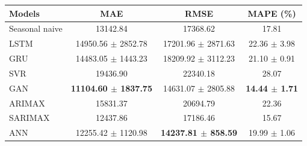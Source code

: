 \begin{tabular}{lccc}
\hline
Models & MAE & RMSE & MAPE (\%) \\
\hline
Seasonal naive & 13142.84 & 17368.62 & 17.81 \\
LSTM & 14950.56 $\pm$ 2852.78 & 17201.96 $\pm$ 2871.63 & 22.36 $\pm$ 3.98 \\
GRU & 14483.05 $\pm$ 1443.23 & 18209.92 $\pm$ 3112.23 & 21.10 $\pm$ 0.91 \\
SVR & 19436.90 & 22340.18 & 28.07 \\
GAN & \textbf{11104.60 $\pm$ 1837.75} & 14631.07 $\pm$ 2805.88 & \textbf{14.44 $\pm$ 1.71} \\
ARIMAX & 15831.37 & 20694.79 & 22.36 \\
SARIMAX & 12437.86 & 17186.46 & 15.67 \\
ANN & 12255.42 $\pm$ 1120.98 & \textbf{14237.81 $\pm$ 858.59} & 19.99 $\pm$ 1.06 \\
\hline
\end{tabular}
